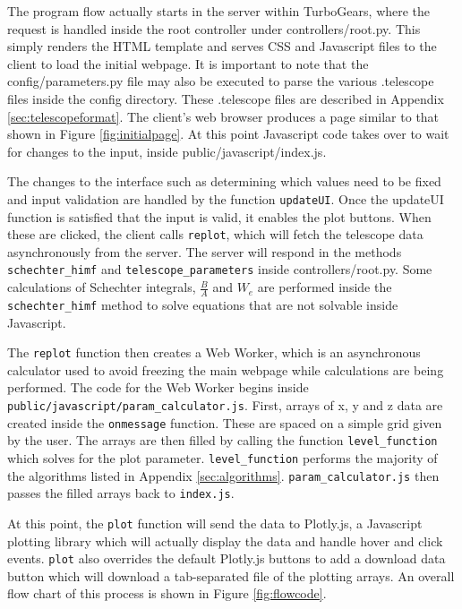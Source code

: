 \documentclass[11pt]{article}
\begin{document}
The program flow actually starts in the server within TurboGears, where the request is handled inside the root controller under controllers/root.py. This simply renders the HTML template and serves CSS and Javascript files to the client to load the initial webpage. It is important to note that the config/parameters.py file may also be executed to parse the various .telescope files inside the config directory. These .telescope files are described in Appendix \ref{sec:telescopeformat}. The client's web browser produces a page similar to that shown in Figure \ref{fig:initialpage}. At this point Javascript code takes over to wait for changes to the input, inside public/javascript/index.js.

The changes to the interface such as determining which values need to be fixed and input validation are handled by the function \texttt{updateUI}. Once the updateUI function is satisfied that the input is valid, it enables the plot buttons. When these are clicked, the client calls \texttt{replot}, which will fetch the telescope data asynchronously from the server. The server will respond in the methods \verb|schechter_himf| and \verb|telescope_parameters| inside controllers/root.py. Some calculations of Schechter integrals, $\frac{B}{A}$ and $W_e$ are performed inside the \verb|schechter_himf| method to solve equations that are not solvable inside Javascript.

The \texttt{replot} function then creates a Web Worker, which is an asynchronous calculator used to avoid freezing the main webpage while calculations are being performed. The code for the Web Worker begins inside \verb|public/javascript/param_calculator.js|. First, arrays of x, y and z data are created inside the \texttt{onmessage} function. These are spaced on a simple grid given by the user. The arrays are then filled by calling the function \verb|level_function| which solves for the plot parameter. \verb|level_function| performs the majority of the algorithms listed in Appendix \ref{sec:algorithms}. \verb|param_calculator.js| then passes the filled arrays back to \verb|index.js|. 

At this point, the \texttt{plot} function will send the data to Plotly.js, a Javascript plotting library which will actually display the data and handle hover and click events. \texttt{plot} also overrides the default Plotly.js buttons to add a download data button which will download a tab-separated file of the plotting arrays. An overall flow chart of this process is shown in Figure \ref{fig:flowcode}.
\appendix
\end{document}
